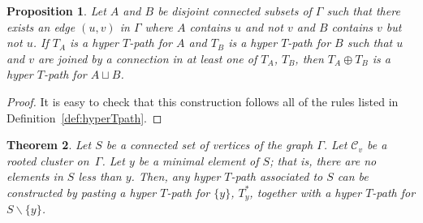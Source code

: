 \documentclass[10pt,a4paper]{amsart}
\numberwithin{equation}{section}
\newtheorem{Theorem}{Theorem}[section]
\newtheorem{Proposition}[Theorem]{Proposition}
 { \theoremstyle{definition}
\newtheorem{Definition}[Theorem]{Definition}
\newtheorem{Note}[Theorem]{Note}
\newtheorem{Example}[Theorem]{Example}
\newtheorem{Remark}[Theorem]{Remark} }
\begin{document}
\begin{Proposition}\label{prop:pasting}
Let $A$ and $B$ be disjoint connected subsets of $\Gamma$ such that there exists an edge $(u,v)$ in $\Gamma$ where $A$ contains $u$ and not $v$ and $B$ contains $v$ but not $u$. If $T_A$ is a hyper $T$-path for $A$ and $T_B$ is a hyper $T$-path for $B$ such that $u$ and $v$ are joined by a connection in at least one of $T_A$, $T_B$, then $T_A\oplus T_B$ is a hyper $T$-path for $A \sqcup B$.
\end{Proposition}
\begin{proof}
It is easy to check that this construction follows all of the rules listed in Defini\-tion~\ref{def:hyperTpath}.
\end{proof}
\begin{Theorem}\label{thm:CanPeelSingleton}
Let $S$ be a connected set of vertices of the graph $\Gamma$. Let $\mathcal{C}_v$ be a rooted cluster on~$\Gamma$. Let $y$ be a minimal element of $S$; that is, there are no elements in $S$ less than $y$. Then, any hyper $T$-path associated to $S$ can be constructed by pasting a hyper $T$-path for $\{ y \}$, $T_{y}^*$, together with a hyper $T$-path for $S \backslash \{ y \}$.
\end{Theorem}
\end{document}
